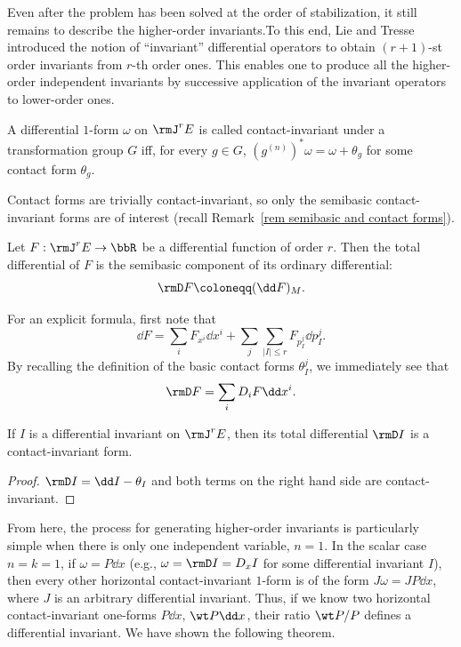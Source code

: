 Even after the problem has been solved at the order of stabilization, it still remains to describe the higher-order invariants.To this end, Lie and Tresse introduced the notion of ``invariant'' differential operators to obtain $(r+1)$-st order invariants from $r$-th order ones. This enables one to produce all the higher-order independent invariants by successive application of the invariant operators to lower-order ones.


\begin{defn}
    A differential $1$-form $\omega$ on $\rmJ^rE$ is called contact-invariant under a transformation group $G$ iff, for every $g\in G$, $(g^{(n)})^\ast \omega=\omega+\theta_g$ for some contact form $\theta_g$.
\end{defn}

Contact forms are trivially contact-invariant, so only the semibasic contact-invariant forms are of interest (recall Remark~\ref{rem semibasic and contact forms}). 

\begin{defn}
    Let $F:\rmJ^r E\to \bbR$ be a differential function of order $r$. Then the total differential of $F$ is the semibasic component of its ordinary differential: 
    \[\rmD F\coloneqq (\dd F)_M.\]
\end{defn}

For an explicit formula, first note that 
\[\dd F=\sum_i F_{x^i}\dd x^i+\sum_j \sum_{|I|\leq r}F_{p^j_I}\dd p^j_I.\]
By recalling the definition of the basic contact forms $\theta^j_I$, we immediately see that 
\[\rmD F=\sum_i D_iF\dd x^i.\]

\begin{prop}
    If $I$ is a differential invariant on $\rmJ^r E$, then its total differential $\rmD I$ is a contact-invariant form.
\end{prop}
\begin{proof}
    $\rmD I=\dd I-\theta_I$ and both terms on the right hand side are contact-invariant.
\end{proof}

From here, the process for generating higher-order invariants is particularly simple when there is only one independent variable, $n=1$. In the scalar case $n=k=1$, if $\omega=P\dd x$ (e.g., $\omega=\rmD I=D_xI$ for some differential invariant $I$), then every other horizontal contact-invariant $1$-form is of the form $J\omega=JP\dd x$, where $J$ is an arbitrary differential invariant. Thus, if we know two horizontal contact-invariant one-forms $P\dd x$, $\wt P\dd x$, their ratio $\wt P/P$ defines a differential invariant. We have shown the following theorem.

